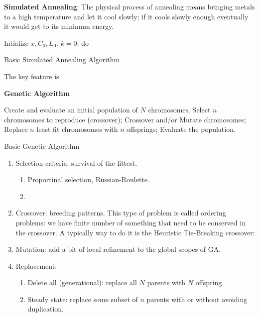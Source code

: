 \documentclass{school-22.211-notes}
\begin{document}
\textbf{Simulated Annealing}: The physical process of annealing means bringing metals to a high temperature and let it cool slowly; if it cools slowly enough eventually it would get to its minimum energy. 
\begin{algorithm}
  \begin{algorithmic}
    \STATE Intialize $x, C_0, L_0$.  $k=0$. 
    \STATE do 
    \ENDWHILE
  \end{algorithmic}
  \caption{Basic Simulated Annealing Algorithm}
\end{algorithm}
The key feature is 


\textbf{Genetic Algorithm}
\begin{algorithm}
  \begin{algorithmic}
    \STATE Create and evaluate an initial population of $N$ chromosomes.
    \STATE Select $n$ chromosomes to reproduce (crossover); 
    \STATE Crossover and/or Mutate chromosomes;
    \STATE Replace $n$ least fit chromosomes with $n$ offsprings;
    \STATE Evaluate the population.
    \ENDWHILE
  \end{algorithmic}
  \caption{Basic Genetic Algorithm}
\end{algorithm}

\begin{enumerate}
\item  Selection criteria: survival of the fittest. 
  \begin{enumerate}
  \item Proportinal selection, Russian-Roulette. 
  \item 
  \end{enumerate}

\item Crossover: breeding patterns. This type of problem is called ordering problems: we have finite number of something that need to be conserved in the crossover. A typically way to do it is the Heuristic Tie-Breaking crossover: 

\item Mutation: add a bit of local refinement to the global scopes of GA. 

\item Replacement: 
  \begin{enumerate}
    \item Delete all (generational): replace all $N$ parents with $N$ offspring.    \item Steady state: replace some subset of $n$ parents with or without avoiding duplication.
  \end{enumerate}
\end{enumerate}
\end{document}

